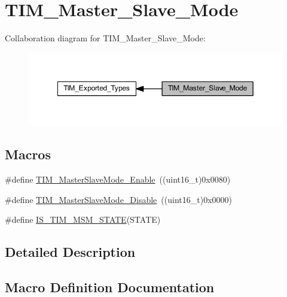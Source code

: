 \hypertarget{group___t_i_m___master___slave___mode}{}\section{T\+I\+M\+\_\+\+Master\+\_\+\+Slave\+\_\+\+Mode}
\label{group___t_i_m___master___slave___mode}
Collaboration diagram for T\+I\+M\+\_\+\+Master\+\_\+\+Slave\+\_\+\+Mode\+:
\nopagebreak
\begin{figure}[H]
\begin{center}
\leavevmode
\includegraphics[width=349pt]{group___t_i_m___master___slave___mode}
\end{center}
\end{figure}
\subsection*{Macros}
\begin{DoxyCompactItemize}
\item 
\#define \hyperlink{group___t_i_m___master___slave___mode_gaef5da910ae6952fce424b440ea39f69a}{T\+I\+M\+\_\+\+Master\+Slave\+Mode\+\_\+\+Enable}~((uint16\+\_\+t)0x0080)
\item 
\#define \hyperlink{group___t_i_m___master___slave___mode_ga8d4c7c0f57469f384b1327bb323d28a3}{T\+I\+M\+\_\+\+Master\+Slave\+Mode\+\_\+\+Disable}~((uint16\+\_\+t)0x0000)
\item 
\#define \hyperlink{group___t_i_m___master___slave___mode_ga53146701cf287a0eca43b9232dffac60}{I\+S\+\_\+\+T\+I\+M\+\_\+\+M\+S\+M\+\_\+\+S\+T\+A\+TE}(S\+T\+A\+TE)
\end{DoxyCompactItemize}


\subsection{Detailed Description}


\subsection{Macro Definition Documentation}
\mbox{\label{group___t_i_m___master___slave___mode_ga53146701cf287a0eca43b9232dffac60}} 
